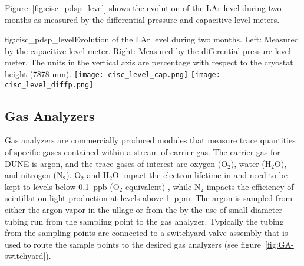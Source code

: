 




Figure~\ref{fig:cisc_pdsp_level} shows the evolution of the  LAr level during two months as measured by the differential pressure and capacitive level meters. 


\begin{dunefigure}{fig:cisc_pdsp_level}{Evolution of the  LAr level during two months. Left: Measured by the capacitive level meter. Right: Measured by the differential pressure level meter. The units in the vertical axis are percentage with respect to the cryostat height (7878 mm).}
  \texttt{[image: cisc\_level\_cap.png]}%
  \hspace*{1cm}
  \texttt{[image: cisc\_level\_diffp.png]}%
\end{dunefigure}

\subsection{Gas Analyzers}
\label{sec:fdgen-slow-cryo-gas-anlyz}

 Gas analyzers are commercially produced modules that measure trace quantities of specific gases contained within a stream of carrier gas. The carrier gas for DUNE is argon, and the trace gases of interest are oxygen ($\text{O}_2$), water ($\text{H}_2\text{O}$), and nitrogen ($\text{N}_2$). $\text{O}_2$ and $\text{H}_2\text{O}$ impact the electron lifetime in  and need to be kept to levels below \SI{0.1}{ppb} ($\text{O}_2$ equivalent) , while $\text{N}_2$ impacts the efficiency of scintillation light production at levels above \SI{1}{ppm}.
The argon is sampled from either the argon vapor in the ullage or from the  by the use of small diameter tubing run from the sampling point to the gas analyzer. Typically the tubing from the sampling points are connected to a switchyard valve assembly that is used to route the sample points to the desired gas analyzers (see figure~\ref{fig:GA-switchyard}).


